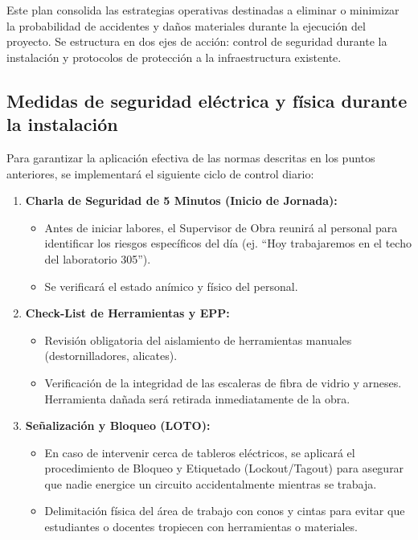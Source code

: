 Este plan consolida las estrategias operativas destinadas a eliminar o minimizar la probabilidad de accidentes y daños materiales durante la ejecución del proyecto. Se estructura en dos ejes de acción: control de seguridad durante la instalación y protocolos de protección a la infraestructura existente.

\subsection*{Medidas de seguridad eléctrica y física durante la instalación}

Para garantizar la aplicación efectiva de las normas descritas en los puntos anteriores, se implementará el siguiente ciclo de control diario:

\begin{enumerate}
    \item \textbf{Charla de Seguridad de 5 Minutos (Inicio de Jornada):}
    \begin{itemize}
        \item Antes de iniciar labores, el Supervisor de Obra reunirá al personal para identificar los riesgos específicos del día (ej. ``Hoy trabajaremos en el techo del laboratorio 305'').
        \item Se verificará el estado anímico y físico del personal.
    \end{itemize}
    \item \textbf{Check-List de Herramientas y EPP:}
    \begin{itemize}
        \item Revisión obligatoria del aislamiento de herramientas manuales (destornilladores, alicates).
        \item Verificación de la integridad de las escaleras de fibra de vidrio y arneses. Herramienta dañada será retirada inmediatamente de la obra.
    \end{itemize}
    \item \textbf{Señalización y Bloqueo (LOTO):}
    \begin{itemize}
        \item En caso de intervenir cerca de tableros eléctricos, se aplicará el procedimiento de Bloqueo y Etiquetado (Lockout/Tagout) para asegurar que nadie energice un circuito accidentalmente mientras se trabaja.
        \item Delimitación física del área de trabajo con conos y cintas para evitar que estudiantes o docentes tropiecen con herramientas o materiales.
    \end{itemize}
\end{enumerate}

